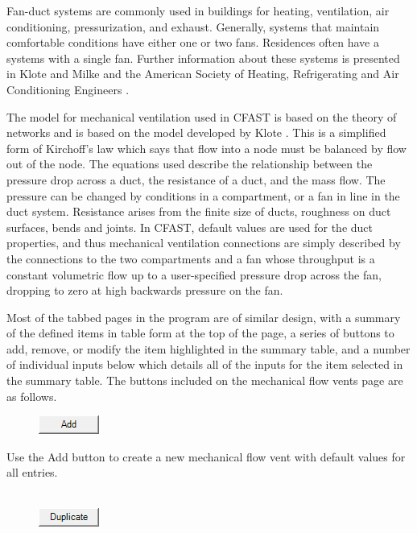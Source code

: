 Fan-duct systems are commonly used in buildings for heating, ventilation, air conditioning, pressurization, and exhaust. Generally, systems that maintain comfortable conditions have either one or two fans.  Residences often have a systems with a single fan. Further information about these systems is presented in  Klote and Milke \cite{Klote:2002} and the American Society of Heating, Refrigerating and Air Conditioning Engineers \cite{ASHRAE:2001}.

The model for mechanical ventilation used in CFAST is based on the theory of networks and is based on the model developed by Klote \cite{Klote:1988a}.  This is a simplified form of Kirchoff's law which says that flow into a node must be balanced by flow out of the node. The equations used describe the relationship between the pressure drop across a duct, the resistance of a duct, and the mass flow.  The pressure can be changed by conditions in a compartment, or a fan in line in the duct system.  Resistance arises from the finite size of ducts, roughness on duct surfaces, bends and joints. In CFAST, default values are used for the duct properties, and thus mechanical ventilation connections are simply described by the connections to the two compartments and a fan whose throughput is a constant volumetric flow up to a user-specified pressure drop across the fan, dropping to zero at high backwards pressure on the fan.

Most of the tabbed pages in the program are of similar design, with a summary of the defined items in table form at the top of the page, a series of buttons to add, remove, or modify the item highlighted in the summary table, and a number of individual inputs below which details all of the inputs for the item selected in the summary table. The buttons included on the mechanical flow vents page are as follows.

\begin{figure}
  \includegraphics[width=0.781in]{FIGURES/Input_File/Add_Button}
\end{figure}

Use the Add button to create a new mechanical flow vent with default values for all entries. \\~ \\

\begin{figure}
  \includegraphics[width=0.781in]{FIGURES/Input_File/Duplicate_Button}
\end{figure}

